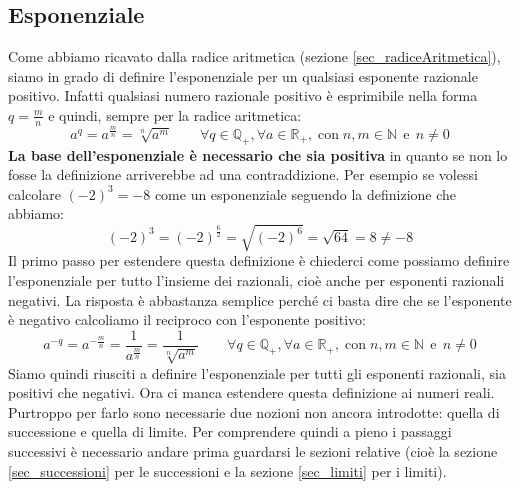 \subsection{Esponenziale}
Come abbiamo ricavato dalla radice aritmetica (sezione 
\ref{sec_radiceAritmetica}), siamo in grado di definire l'esponenziale per un 
qualsiasi esponente razionale positivo. Infatti qualsiasi numero razionale 
positivo è esprimibile nella forma $q = \frac{m}{n}$ e quindi, sempre per la 
radice aritmetica:
\begin{equation*}
    a^q = a^{\frac{m}{n}} = \sqrt[n]{a^m} \qquad \forall q \in \mathbb{Q}_{+}, 
    \forall a \in \mathbb{R}_{+},\; \mathrm{con}\; n,m \in \mathbb{N}\;\, 
    \mathrm{e}\;\, n \neq 0
\end{equation*}
\textbf{La base dell'esponenziale è necessario che sia positiva} in quanto se 
non lo fosse la definizione arriverebbe ad una contraddizione. Per esempio se 
volessi calcolare $(-2)^3 = -8$ come un esponenziale seguendo la definizione 
che abbiamo:
\begin{equation*}
    (-2)^3 = (-2)^{\frac{6}{2}} = \sqrt{(-2)^6} = \sqrt{64} = 8 \neq -8
\end{equation*}
Il primo passo per estendere questa definizione è chiederci come possiamo 
definire l'esponenziale per tutto l'insieme dei razionali, cioè anche per 
esponenti razionali negativi. La risposta è abbastanza semplice perché ci basta 
dire che se l'esponente è negativo calcoliamo il reciproco con l'esponente 
positivo:
\begin{equation*}
    a^{-q} = a^{-\frac{m}{n}} = \dfrac{1}{a^{\frac{m}{n}}} = \dfrac{1}
    {\sqrt[n]{a^m}} \qquad \forall q \in \mathbb{Q}_{+}, \forall a \in 
    \mathbb{R}_{+},\; \mathrm{con}\; n,m \in \mathbb{N}\;\, \mathrm{e}\;\, n 
    \neq 0
\end{equation*}
Siamo quindi riusciti a definire l'esponenziale per tutti gli esponenti 
razionali, sia positivi che negativi. Ora ci manca estendere questa definizione 
ai numeri reali. Purtroppo per farlo sono necessarie due nozioni non ancora 
introdotte: quella di successione e quella di limite. Per comprendere quindi a 
pieno i passaggi successivi è necessario andare prima guardarsi le sezioni 
relative (cioè la sezione \ref{sec_successioni} per le successioni e la sezione 
\ref{sec_limiti} per i limiti).\\


